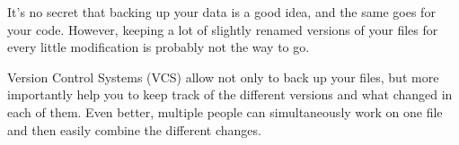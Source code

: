 
It's no secret that backing up your data is a good idea, and the same goes for your code.
However, keeping a lot of slightly renamed versions of your files for every little modification is probably not the way to go.

Version Control Systems (VCS) allow not only to back up your files,
but more importantly help you to keep track of the different versions and what changed in each of them.
Even better, multiple people can simultaneously work on one file and then easily combine the different changes.

